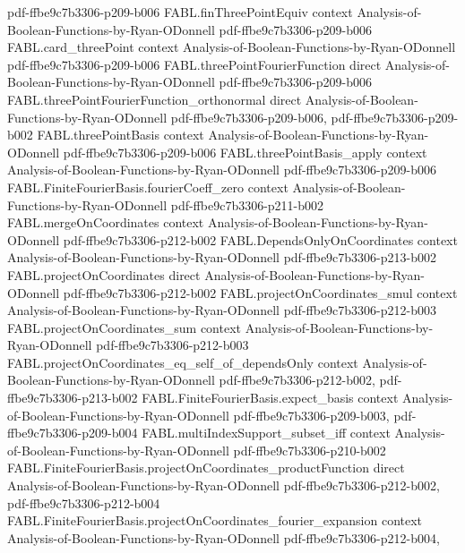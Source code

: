 \begin{theorem}
  {pdf-ffbe9c7b3306-p209-b006}
\proofstep
  {FABL.finThreePointEquiv}
  {context}
  {Analysis-of-Boolean-Functions-by-Ryan-ODonnell}
  {pdf-ffbe9c7b3306-p209-b006}
\proofstep
  {FABL.card_threePoint}
  {context}
  {Analysis-of-Boolean-Functions-by-Ryan-ODonnell}
  {pdf-ffbe9c7b3306-p209-b006}
\proofstep
  {FABL.threePointFourierFunction}
  {direct}
  {Analysis-of-Boolean-Functions-by-Ryan-ODonnell}
  {pdf-ffbe9c7b3306-p209-b006}
\proofstep
  {FABL.threePointFourierFunction_orthonormal}
  {direct}
  {Analysis-of-Boolean-Functions-by-Ryan-ODonnell}
  {pdf-ffbe9c7b3306-p209-b006,
    pdf-ffbe9c7b3306-p209-b002}
\proofstep
  {FABL.threePointBasis}
  {context}
  {Analysis-of-Boolean-Functions-by-Ryan-ODonnell}
  {pdf-ffbe9c7b3306-p209-b006}
\proofstep
  {FABL.threePointBasis_apply}
  {context}
  {Analysis-of-Boolean-Functions-by-Ryan-ODonnell}
  {pdf-ffbe9c7b3306-p209-b006}
\proofstep
  {FABL.FiniteFourierBasis.fourierCoeff_zero}
  {context}
  {Analysis-of-Boolean-Functions-by-Ryan-ODonnell}
  {pdf-ffbe9c7b3306-p211-b002}
\proofstep
  {FABL.mergeOnCoordinates}
  {context}
  {Analysis-of-Boolean-Functions-by-Ryan-ODonnell}
  {pdf-ffbe9c7b3306-p212-b002}
\proofstep
  {FABL.DependsOnlyOnCoordinates}
  {context}
  {Analysis-of-Boolean-Functions-by-Ryan-ODonnell}
  {pdf-ffbe9c7b3306-p213-b002}
\proofstep
  {FABL.projectOnCoordinates}
  {direct}
  {Analysis-of-Boolean-Functions-by-Ryan-ODonnell}
  {pdf-ffbe9c7b3306-p212-b002}
\proofstep
  {FABL.projectOnCoordinates_smul}
  {context}
  {Analysis-of-Boolean-Functions-by-Ryan-ODonnell}
  {pdf-ffbe9c7b3306-p212-b003}
\proofstep
  {FABL.projectOnCoordinates_sum}
  {context}
  {Analysis-of-Boolean-Functions-by-Ryan-ODonnell}
  {pdf-ffbe9c7b3306-p212-b003}
\proofstep
  {FABL.projectOnCoordinates_eq_self_of_dependsOnly}
  {context}
  {Analysis-of-Boolean-Functions-by-Ryan-ODonnell}
  {pdf-ffbe9c7b3306-p212-b002,
    pdf-ffbe9c7b3306-p213-b002}
\proofstep
  {FABL.FiniteFourierBasis.expect_basis}
  {context}
  {Analysis-of-Boolean-Functions-by-Ryan-ODonnell}
  {pdf-ffbe9c7b3306-p209-b003,
    pdf-ffbe9c7b3306-p209-b004}
\proofstep
  {FABL.multiIndexSupport_subset_iff}
  {context}
  {Analysis-of-Boolean-Functions-by-Ryan-ODonnell}
  {pdf-ffbe9c7b3306-p210-b002}
\proofstep
  {FABL.FiniteFourierBasis.projectOnCoordinates_productFunction}
  {direct}
  {Analysis-of-Boolean-Functions-by-Ryan-ODonnell}
  {pdf-ffbe9c7b3306-p212-b002,
    pdf-ffbe9c7b3306-p212-b004}
\proofstep
  {FABL.FiniteFourierBasis.projectOnCoordinates_fourier_expansion}
  {context}
  {Analysis-of-Boolean-Functions-by-Ryan-ODonnell}
  {pdf-ffbe9c7b3306-p212-b004,
}
\end{theorem}
